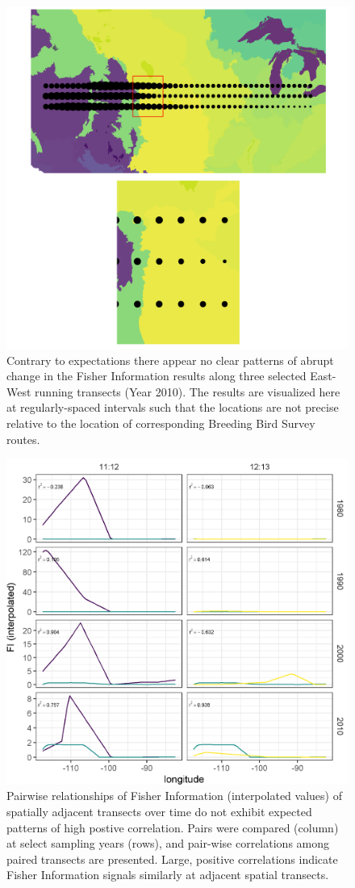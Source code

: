\documentclass[12pt,twoside,openany]{reedthesis}
\begin{document}
\begin{figure}
\includegraphics[width=0.85\linewidth]{./chapterFiles/fisherSpatial/figures/figsCalledInDiss/scaledFiInterpolated_year2010_zoom_East-West} \caption{Contrary to expectations there appear no clear patterns of abrupt change in the Fisher Information results along three selected East-West running transects  (Year 2010). The results are visualized here at regularly-spaced intervals such that the locations are not precise relative to the location of corresponding Breeding Bird Survey routes.}\label{fig:fiEcoregion}
\end{figure}
\begin{figure}
\includegraphics[width=0.85\linewidth]{./chapterFiles/fisherSpatial/figures/figsCalledInDiss/interpolated_FI_corplotSelectTransects_East-West} \caption{Pairwise relationships of Fisher Information (interpolated values) of spatially adjacent transects over time do not exhibit expected patterns of high postive correlation. Pairs were compared (column) at select sampling years (rows), and pair-wise correlations among paired transects are presented. Large, positive correlations indicate Fisher Information signals similarly at adjacent spatial transects.}\label{fig:corPlotTsectsInterp}
\end{figure}
\end{document}
